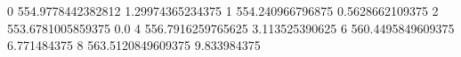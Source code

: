 0 554.9778442382812 1.29974365234375
1 554.240966796875 0.5628662109375
2 553.6781005859375 0.0
4 556.7916259765625 3.113525390625
6 560.4495849609375 6.771484375
8 563.5120849609375 9.833984375
